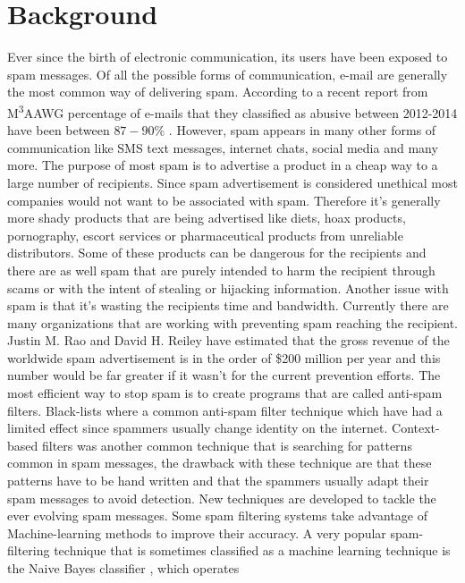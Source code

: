 
\section{Background}

Ever since the birth of electronic communication, its users have been exposed
to spam messages. Of all the possible forms of communication, e-mail are
generally the most common way of delivering spam. 
According to a recent report from M\textsuperscript{3}AAWG percentage of
e-mails that they classified as abusive between 2012-2014 have been between
$87-90\%$ \cite{M3AAWG2014}.  However, spam appears in many other forms of
communication like SMS text messages, internet chats, social media and many
more. The purpose of most spam is to advertise a product in a cheap way to a
large number of recipients. Since spam advertisement is considered unethical
most companies would not want to be associated with spam.  Therefore it's
generally more shady products that are being advertised like diets, hoax
products, pornography, escort services or pharmaceutical products from
unreliable distributors\cite{wikipedia}. Some of these products can be
dangerous for the recipients and there are as well spam that are purely
intended to harm the recipient through scams or with the intent of stealing or
hijacking information.  Another issue with spam is that it's wasting the
recipients time and bandwidth. Currently there are many organizations that are
working with preventing spam reaching the recipient.  Justin M. Rao and David
H. Reiley \cite{rao2012economics} have estimated that the gross revenue of the
worldwide spam advertisement is in the order of \$200 million per year and this
number would be far greater if it wasn't for the current prevention efforts.
The most efficient way to stop spam is to create programs that are called
anti-spam filters. Black-lists where a common anti-spam filter technique which
have had a limited effect since spammers usually change identity on the
internet.  Context-based filters was another common technique that is searching
for patterns common in spam messages, the drawback with these technique are
that these patterns have to be hand written and that the spammers usually adapt
their spam messages to avoid detection. New techniques are developed to tackle
the ever evolving spam messages.\cite{spam-techniques} Some spam filtering
systems take advantage of Machine-learning methods to improve their accuracy. A
very popular spam-filtering technique that is sometimes classified as a machine
learning technique is the Naive Bayes classifier \cite{bayes}, which operates
